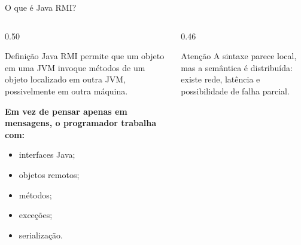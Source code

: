 \documentclass[aspectratio=169]{beamer}
\begin{document}
\begin{frame}{O que é Java RMI?}
    \begin{columns}[T]
        \begin{column}{0.50\textwidth}
            \begin{block}{Definição}
                Java RMI permite que um objeto em uma JVM invoque métodos de um objeto localizado em outra JVM, possivelmente em outra máquina.
            \end{block}

            \vspace{0.2cm}
            \textbf{Em vez de pensar apenas em mensagens, o programador trabalha com:}
            \begin{itemize}
                \item interfaces Java;
                \item objetos remotos;
                \item métodos;
                \item exceções;
                \item serialização.
            \end{itemize}
        \end{column}

        \begin{column}{0.46\textwidth}
            \centering

            \vspace{0.5cm}
            \begin{alertblock}{Atenção}
                A sintaxe parece local, mas a semântica é distribuída: existe rede, latência e possibilidade de falha parcial.
            \end{alertblock}
        \end{column}
    \end{columns}
\end{frame}
\end{document}
